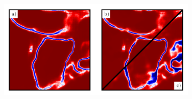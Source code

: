 
\begin{figure}
        \centering
\begin{minipage}{0.45\textwidth}
\centering
        \includegraphics[width=0.85\textwidth,trim=0.1in 0.0in 0.05in 0.0in,clip]{figs/noisy_affs_comparison.png}
   

\end{minipage}
\end{figure}
